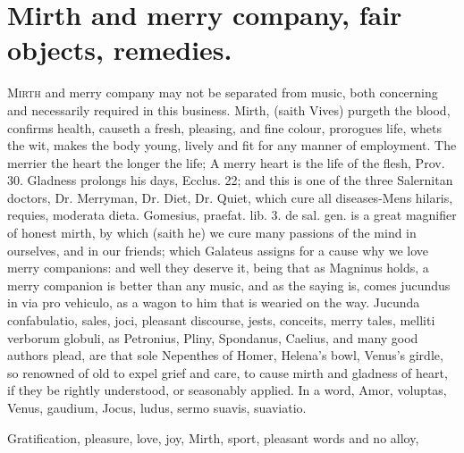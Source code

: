 {%
\section[Mirth and merry company]{Mirth and merry company, fair objects, remedies.}

\lettrine{M}{irth} and merry company may not be separated from music, both
concerning and necessarily required in this business. Mirth, (saith
Vives) purgeth the blood, confirms health, causeth a fresh,
pleasing, and fine colour, prorogues life, whets the wit, makes the
body young, lively and fit for any manner of employment. The merrier
the heart the longer the life; A merry heart is the life of the flesh,
Prov.  30. Gladness prolongs his days, Ecclus.  22; and this is
one of the three Salernitan doctors, Dr. Merryman, Dr. Diet, Dr. Quiet,
which cure all diseases-Mens hilaris, requies, moderata dieta.
Gomesius, praefat. lib. 3. de sal. gen. is a great magnifier of
honest mirth, by which (saith he) we cure many passions of the mind in
ourselves, and in our friends; which Galateus assigns for a cause
why we love merry companions: and well they deserve it, being that as
Magninus holds, a merry companion is better than any music, and
as the saying is, comes jucundus in via pro vehiculo, as a wagon to him
that is wearied on the way. Jucunda confabulatio, sales, joci, pleasant
discourse, jests, conceits, merry tales, melliti verborum globuli, as
Petronius,  Pliny, Spondanus, Caelius, and many good
authors plead, are that sole Nepenthes of Homer, Helena's bowl, Venus's
girdle, so renowned of old to expel grief and care, to cause
mirth and gladness of heart, if they be rightly understood, or
seasonably applied. In a word,
Amor, voluptas, Venus, gaudium,
Jocus, ludus, sermo suavis, suaviatio.

Gratification, pleasure, love, joy,
Mirth, sport, pleasant words and no alloy,

}
